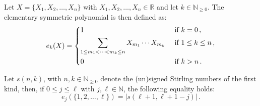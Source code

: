 \begin{definition}
Let $X = \{ X_1, X_2, \dots, X_n \}$ with $X_1, X_2, \dots, X_n \in \mathbb R$ and let $k \in \mathbb N_{\geq0}$.
The elementary symmetric polynomial is then defined as:
\begin{equation}
    e_k(X) = \begin{dcases}
        1 & \textrm{ if } k = 0\,, \\
        \sum_{1 \leq m_1 < \cdots < m_k \leq n} X_{m_1} \cdots X_{m_k} & \textrm{ if } 1 \leq k \leq n\,, \\
        0 & \textrm{ if } k > n\,.
    \end{dcases} \nonumber
\end{equation}
\end{definition}


\begin{lemma}
\label{lemma:complete}
Let $s(n, k)$, with $n,k \in \mathbb N_{\geq 0}$ denote the (un)signed Stirling numbers of the first kind, then, if $0\leq j \leq \ell$ with $j,\ell \in \mathbb N$, the following equality holds:
\begin{equation}
    e_j(\{ 1, 2, \dots, \ell \}) = |s(\ell+1, \ell+1-j)| \,. \label{eq:ind_step}
\end{equation}
\end{lemma}
